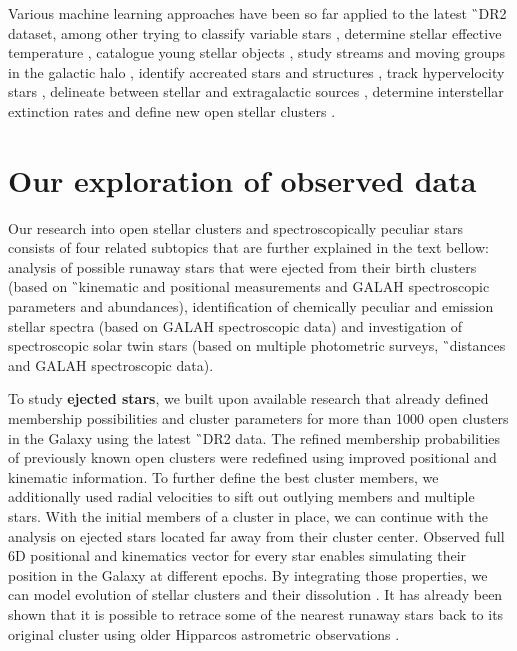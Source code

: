 Various machine learning approaches have been so far applied to the latest \G\ DR2 dataset, among other trying to classify variable stars \cite{2020MNRAS.493.2981B}, determine stellar effective temperature \cite{2019AJ....158...93B}, catalogue young stellar objects \cite{2019MNRAS.487.2522M}, study streams and moving groups in the galactic halo \cite{2017A&A...598A..58H, 2020MNRAS.492.1370B}, identify accreated stars and structures \cite{2019arXiv190706652O, 2019arXiv190707681N}, track hypervelocity stars \cite{2017MNRAS.470.1388M}, delineate between stellar and extragalactic sources \cite{2018RAA....18..118B, 2019MNRAS.490.5615B}, determine interstellar extinction rates \cite{2020AJ....159...84B} and define new open stellar clusters \cite{2020A&A...635A..45C}.

\section{Our exploration of observed data}
Our research into open stellar clusters and spectroscopically peculiar stars consists of four related subtopics that are further explained in the text bellow: analysis of possible runaway stars that were ejected from their birth clusters (based on \G\ kinematic and positional measurements and GALAH spectroscopic parameters and abundances), identification of chemically peculiar and emission stellar spectra (based on GALAH spectroscopic data) and investigation of spectroscopic solar twin stars (based on multiple photometric surveys, \G\ distances and GALAH spectroscopic data).

To study \textbf{ejected stars}, we built upon available research that already defined membership possibilities and cluster parameters for more than 1000 open clusters in the Galaxy \cite{2018A&A...618A..93C} using the latest \G\ DR2 data. The refined membership probabilities of previously known open clusters \cite{2013A&A...558A..53K} were redefined using improved positional and kinematic information. To further define the best cluster members, we additionally used radial velocities to sift out outlying members and multiple stars. With the initial members of a cluster in place, we can continue with the analysis on ejected stars located far away from their cluster center. Observed full 6D positional and kinematics vector for every star enables simulating their position in the Galaxy at different epochs. By integrating those properties, we can model evolution of stellar clusters and their dissolution \cite{1998A&A...337..363P}. It has already been shown that it is possible to retrace some of the nearest runaway stars back to its original cluster using older Hipparcos astrometric observations \cite{2000ApJ...544L.133H}.

